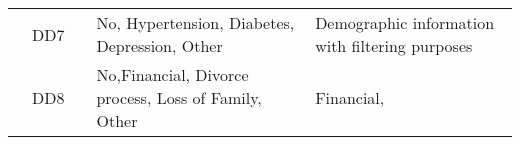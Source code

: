 \documentclass[10pt,letterpaper]{article}
\begin{document}
\begin{table}[ht]
\begin{tabular}{|l|l|l|p{5cm}|p{4cm}|}
		& DD7                                   &                                    & No, Hypertension, Diabetes, Depression, Other                                            & Demographic information with filtering purposes                 \\ \cline{2-5} 
		& DD8                                   &                                    & No,Financial, Divorce process, Loss of Family, Other                                     & Financial,                                                      \\ \hline
	\end{tabular}
\end{table}
\end{document}
